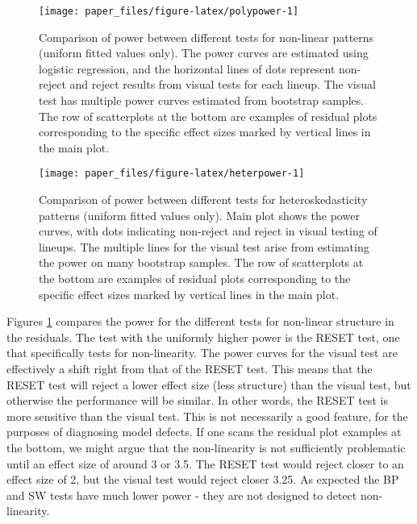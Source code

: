 \documentclass[]{interact}
\theoremstyle{plain}%
\theoremstyle{definition}
\theoremstyle{remark}
\begin{document}
\begin{figure}

{\centering \texttt{[image: paper\_files/figure-latex/polypower-1]} 

}

\caption{Comparison of power between different tests for non-linear patterns (uniform fitted values only). The power curves are estimated using logistic regression, and the horizontal lines of dots represent non-reject and reject results from visual tests for each lineup. The visual test has multiple power curves estimated from bootstrap samples. The row of scatterplots at the bottom are examples of residual plots corresponding to the specific effect sizes marked by vertical lines in the main plot.}\label{fig:polypower}
\end{figure}

\begin{figure}

{\centering \texttt{[image: paper\_files/figure-latex/heterpower-1]} 

}

\caption{Comparison of power between different tests for heteroskedasticity patterns (uniform fitted values only). Main plot shows the power curves, with dots indicating non-reject and reject in visual testing of lineups. The multiple lines for the visual test arise from estimating the power on many bootstrap samples. The row of scatterplots at the bottom are examples of residual plots corresponding to the specific effect sizes marked by vertical lines in the main plot.}\label{fig:heterpower}
\end{figure}

Figures \ref{fig:polypower} compares the power for the different tests
for non-linear structure in the residuals. The test with the uniformly
higher power is the RESET test, one that specifically tests for
non-linearity. The power curves for the visual test are effectively a
shift right from that of the RESET test. This means that the RESET test
will reject a lower effect size (less structure) than the visual test,
but otherwise the performance will be similar. In other words, the RESET
test is more sensitive than the visual test. This is not necessarily a
good feature, for the purposes of diagnosing model defects. If one scans
the residual plot examples at the bottom, we might argue that the
non-linearity is not sufficiently problematic until an effect size of
around 3 or 3.5. The RESET test would reject closer to an effect size of
2, but the visual test would reject closer 3.25. As expected the BP and
SW tests have much lower power - they are not designed to detect
non-linearity.
\end{document}
